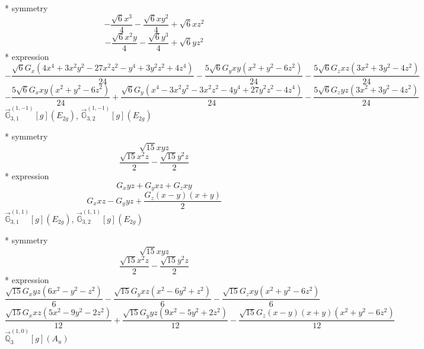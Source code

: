 \documentclass[fleqn,8pt]{jsarticle}
\begin{document}
\noindent\quad ** symmetry
\begin{dmath*}
- \frac{\sqrt{6} x^{3}}{4} - \frac{\sqrt{6} x y^{2}}{4} + \sqrt{6} x z^{2}
\end{dmath*}
\begin{dmath*}
- \frac{\sqrt{6} x^{2} y}{4} - \frac{\sqrt{6} y^{3}}{4} + \sqrt{6} y z^{2}
\end{dmath*}
\noindent\quad ** expression
\begin{dmath*}
- \frac{\sqrt{6} G_{x} \left(4 x^{4} + 3 x^{2} y^{2} - 27 x^{2} z^{2} - y^{4} + 3 y^{2} z^{2} + 4 z^{4}\right)}{24} - \frac{5 \sqrt{6} G_{y} x y \left(x^{2} + y^{2} - 6 z^{2}\right)}{24} - \frac{5 \sqrt{6} G_{z} x z \left(3 x^{2} + 3 y^{2} - 4 z^{2}\right)}{24}
\end{dmath*}
\begin{dmath*}
- \frac{5 \sqrt{6} G_{x} x y \left(x^{2} + y^{2} - 6 z^{2}\right)}{24} + \frac{\sqrt{6} G_{y} \left(x^{4} - 3 x^{2} y^{2} - 3 x^{2} z^{2} - 4 y^{4} + 27 y^{2} z^{2} - 4 z^{4}\right)}{24} - \frac{5 \sqrt{6} G_{z} y z \left(3 x^{2} + 3 y^{2} - 4 z^{2}\right)}{24}
\end{dmath*}
\noindent\quad $\vec{\mathbb{G}}_{3,1}^{(1,-1)}[g](E_{2g})$, $\vec{\mathbb{G}}_{3,2}^{(1,-1)}[g](E_{2g})$

\noindent\quad ** symmetry
\begin{dmath*}
\sqrt{15} x y z
\end{dmath*}
\begin{dmath*}
\frac{\sqrt{15} x^{2} z}{2} - \frac{\sqrt{15} y^{2} z}{2}
\end{dmath*}
\noindent\quad ** expression
\begin{dmath*}
G_{x} y z + G_{y} x z + G_{z} x y
\end{dmath*}
\begin{dmath*}
G_{x} x z - G_{y} y z + \frac{G_{z} \left(x - y\right) \left(x + y\right)}{2}
\end{dmath*}
\noindent\quad $\vec{\mathbb{G}}_{3,1}^{(1,1)}[g](E_{2g})$, $\vec{\mathbb{G}}_{3,2}^{(1,1)}[g](E_{2g})$

\noindent\quad ** symmetry
\begin{dmath*}
\sqrt{15} x y z
\end{dmath*}
\begin{dmath*}
\frac{\sqrt{15} x^{2} z}{2} - \frac{\sqrt{15} y^{2} z}{2}
\end{dmath*}
\noindent\quad ** expression
\begin{dmath*}
\frac{\sqrt{15} G_{x} y z \left(6 x^{2} - y^{2} - z^{2}\right)}{6} - \frac{\sqrt{15} G_{y} x z \left(x^{2} - 6 y^{2} + z^{2}\right)}{6} - \frac{\sqrt{15} G_{z} x y \left(x^{2} + y^{2} - 6 z^{2}\right)}{6}
\end{dmath*}
\begin{dmath*}
\frac{\sqrt{15} G_{x} x z \left(5 x^{2} - 9 y^{2} - 2 z^{2}\right)}{12} + \frac{\sqrt{15} G_{y} y z \left(9 x^{2} - 5 y^{2} + 2 z^{2}\right)}{12} - \frac{\sqrt{15} G_{z} \left(x - y\right) \left(x + y\right) \left(x^{2} + y^{2} - 6 z^{2}\right)}{12}
\end{dmath*}
\noindent\quad $\vec{\mathbb{Q}}_{3}^{(1,0)}[g](A_{u})$
\end{document}
